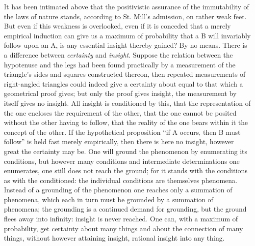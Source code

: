 \documentclass[12pt]{article}
\begin{document}
It has been intimated above that the positivistic assurance of the
immutability of the laws of nature stands, according to St. Mill's
admission, on rather weak feet. But even if this weakness is overlooked, even
if it is conceded that a merely empirical induction can give us a maximum of
probability that a B will invariably follow upon an A, is any essential
insight thereby gained? By no means. There is a difference between
\emph{certainty} and \emph{insight}. Suppose the relation between the
hypotenuse and the legs had been found practically by a measurement of the
triangle's sides and squares constructed thereon, then repeated measurements
of right-angled triangles could indeed give a certainty about equal to that
which a geometrical proof gives; but only the proof gives insight, the
measurement by itself gives no insight. All insight is conditioned by this,
that the representation of the one encloses the requirement of the other,
that the one cannot be posited without the other having to follow, that the
reality of the one bears within it the concept of the other. If the
hypothetical proposition ``if A occurs, then B must follow'' is held fast
merely empirically, then there is here no insight, however great the
certainty may be. One will ground the phenomenon by enumerating its
conditions, but however many conditions and intermediate determinations one
enumerates, one still does not reach the ground; for it stands with the
conditions as with the conditioned: the individual conditions are themselves
phenomena. Instead of a grounding of the
phenomenon one reaches only a summation of phenomena, which each in turn
must be grounded by a summation of phenomena; the grounding is a continued
demand for grounding, but the ground flees away into infinity: insight is
never reached. One can, with a maximum of probability, get certainty about
many things and about the connection of many things, without however
attaining insight, rational insight into any thing.
\end{document}
